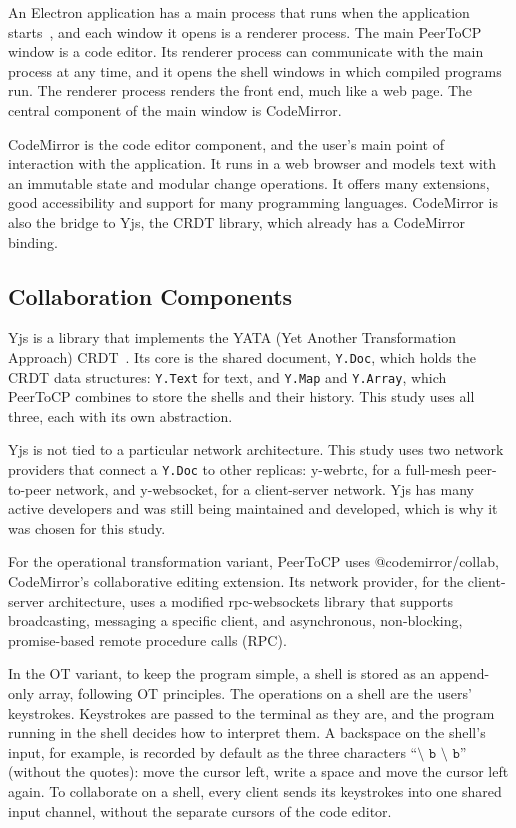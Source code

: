 An Electron application has a main process that runs when the application starts~\citep{electron}, and each window it opens is a renderer process. The main PeerToCP window is a code editor. Its renderer process can communicate with the main process at any time, and it opens the shell windows in which compiled programs run. The renderer process renders the front end, much like a web page. The central component of the main window is CodeMirror.

CodeMirror is the code editor component, and the user's main point of interaction with the application. It runs in a web browser and models text with an immutable state and modular change operations. It offers many extensions, good accessibility and support for many programming languages. CodeMirror is also the bridge to Yjs, the CRDT library, which already has a CodeMirror binding.

\subsection{Collaboration Components}

Yjs is a library that implements the YATA (Yet Another Transformation Approach) CRDT~\citep{Nicolaescu2016yjs}. Its core is the shared document, \texttt{Y.Doc}, which holds the CRDT data structures: \texttt{Y.Text} for text, and \texttt{Y.Map} and \texttt{Y.Array}, which PeerToCP combines to store the shells and their history. This study uses all three, each with its own abstraction.

Yjs is not tied to a particular network architecture. This study uses two network providers that connect a \texttt{Y.Doc} to other replicas: y-webrtc, for a full-mesh peer-to-peer network, and y-websocket, for a client-server network. Yjs has many active developers and was still being maintained and developed, which is why it was chosen for this study.

For the operational transformation variant, PeerToCP uses @codemirror/collab, CodeMirror's collaborative editing extension. Its network provider, for the client-server architecture, uses a modified rpc-websockets library that supports broadcasting, messaging a specific client, and asynchronous, non-blocking, promise-based remote procedure calls (RPC).

In the OT variant, to keep the program simple, a shell is stored as an append-only array, following OT principles. The operations on a shell are the users' keystrokes. Keystrokes are passed to the terminal as they are, and the program running in the shell decides how to interpret them. A backspace on the shell's input, for example, is recorded by default as the three characters ``$\texttt{\char`\\ b \char`\\ b}$'' (without the quotes): move the cursor left, write a space and move the cursor left again. To collaborate on a shell, every client sends its keystrokes into one shared input channel, without the separate cursors of the code editor.

